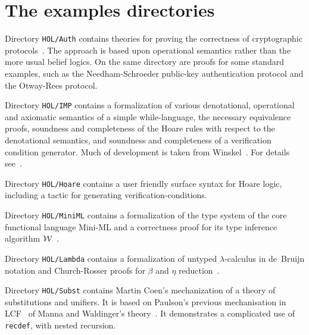 \section{The examples directories}

Directory \texttt{HOL/Auth} contains theories for proving the correctness of
cryptographic protocols~\cite{paulson-jcs}.  The approach is based upon
operational semantics rather than the more usual belief logics.  On the same
directory are proofs for some standard examples, such as the Needham-Schroeder
public-key authentication protocol and the Otway-Rees
protocol.

Directory \texttt{HOL/IMP} contains a formalization of various denotational,
operational and axiomatic semantics of a simple while-language, the necessary
equivalence proofs, soundness and completeness of the Hoare rules with
respect to the denotational semantics, and soundness and completeness of a
verification condition generator.  Much of development is taken from
Winskel~\cite{winskel93}.  For details see~\cite{nipkow-IMP}.

Directory \texttt{HOL/Hoare} contains a user friendly surface syntax for Hoare
logic, including a tactic for generating verification-conditions.

Directory \texttt{HOL/MiniML} contains a formalization of the type system of
the core functional language Mini-ML and a correctness proof for its type
inference algorithm $\cal W$~\cite{milner78,nipkow-W}.

Directory \texttt{HOL/Lambda} contains a formalization of untyped
$\lambda$-calculus in de~Bruijn notation and Church-Rosser proofs for $\beta$
and $\eta$ reduction~\cite{Nipkow-CR}.

Directory \texttt{HOL/Subst} contains Martin Coen's mechanization of a theory
of substitutions and unifiers.  It is based on Paulson's previous
mechanisation in LCF~\cite{paulson85} of Manna and Waldinger's
theory~\cite{mw81}.  It demonstrates a complicated use of \texttt{recdef},
with nested recursion.

